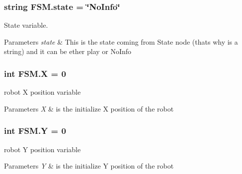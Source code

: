\subsubsection[{\texorpdfstring{state}{state}}]{\setlength{\rightskip}{0pt plus 5cm}string F\+S\+M.\+state = \char`\"{}No\+Info\char`\"{}}\hypertarget{namespaceFSM_a219d5c5ac08bd4c51a0f20bd27482dee}{}\label{namespaceFSM_a219d5c5ac08bd4c51a0f20bd27482dee}


State variable. 


\begin{DoxyParams}{Parameters}
{\em state} & This is the state coming from State node (that\textquotesingle{}s why is a string) and it can be ether play or No\+Info \\
\hline
\end{DoxyParams}
\subsubsection[{\texorpdfstring{X}{X}}]{\setlength{\rightskip}{0pt plus 5cm}int F\+S\+M.\+X = 0}\hypertarget{namespaceFSM_ad4b9b754f58d2d256867e34136aa3563}{}\label{namespaceFSM_ad4b9b754f58d2d256867e34136aa3563}


robot X position variable 


\begin{DoxyParams}{Parameters}
{\em X} & is the initialize X position of the robot \\
\hline
\end{DoxyParams}
\subsubsection[{\texorpdfstring{Y}{Y}}]{\setlength{\rightskip}{0pt plus 5cm}int F\+S\+M.\+Y = 0}\hypertarget{namespaceFSM_a90bf96bcb08f06c46475422464d23e6e}{}\label{namespaceFSM_a90bf96bcb08f06c46475422464d23e6e}


robot Y position variable 


\begin{DoxyParams}{Parameters}
{\em Y} & is the initialize Y position of the robot \\
\hline
\end{DoxyParams}
